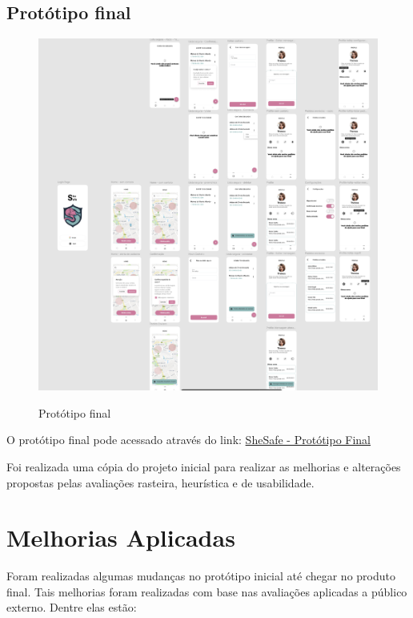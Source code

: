 \subsection{Protótipo final}
\begin{figure}[h]
	\begin{center}
		\includegraphics[width=0.7\linewidth]{images/prototipo-final.png}\\
	\end{center}
	\caption[Protótipo final]{Protótipo final}
	\label{fig:prototipo-final}
\end{figure}
\pagebreak
O protótipo final pode acessado através do link: \href{https://www.figma.com/proto/GALwTZKTsmvOVWX4JARmOB/SheSafe-Corrigido?node-id=26-653&viewport=2654%2C786%2C0.79&t=dkVCQTw83BbPw3KK-0&scaling=min-zoom&starting-point-node-id=26%3A653}{SheSafe - Protótipo Final}

Foi realizada uma cópia do projeto inicial para realizar as melhorias e alterações propostas pelas avaliações rasteira, heurística e de usabilidade.

\section{Melhorias Aplicadas}
Foram realizadas algumas mudanças no protótipo inicial até chegar no produto final. Tais melhorias foram realizadas com base nas avaliações aplicadas a público externo. Dentre elas estão:

